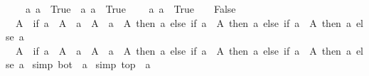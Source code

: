 \begin{isabellebody}
\ \ \ {\isacharbar}{\kern0pt}\ {\isacharparenleft}{\kern0pt}a\ a\ {\isasymRightarrow}\ True\ {\isacharbar}{\kern0pt}\ {\isacharparenleft}{\kern0pt}a\ a\ {\isasymRightarrow}\ True\isanewline
\ \ \ {\isacharbar}{\kern0pt}\ {\isacharparenleft}{\kern0pt}a\ a\ {\isasymRightarrow}\ True\ {\isacharbar}{\kern0pt}\ {\isacharunderscore}{\kern0pt}\ {\isasymRightarrow}\ False{\isacharparenright}{\kern0pt}{\isachardoublequoteclose}\isanewline
\isanewline
{}\isamarkupfalse%
\isanewline
\ \ {\isachardoublequoteopen}{\isasymSqinter}A\ {\isacharequal}{\kern0pt}\ {\isacharparenleft}{\kern0pt}if\ a\ {\isasymin}\ A\ {\isasymor}\ a\ {\isasymin}\ A\ {\isasymand}\ a\ {\isasymin}\ A\ then\ a\ else\ if\ a\ {\isasymin}\ A\ then\ a\ else\ if\ a\ {\isasymin}\ A\ then\ a\ else\ a\isanewline
{}\isamarkupfalse%
\isanewline
\ \ {\isachardoublequoteopen}{\isasymSqunion}A\ {\isacharequal}{\kern0pt}\ {\isacharparenleft}{\kern0pt}if\ a\ {\isasymin}\ A\ {\isasymor}\ a\ {\isasymin}\ A\ {\isasymand}\ a\ {\isasymin}\ A\ then\ a\ else\ if\ a\ {\isasymin}\ A\ then\ a\ else\ if\ a\ {\isasymin}\ A\ then\ a\ else\ a\isanewline
{}\isamarkupfalse%
\ {\isacharbrackleft}{\kern0pt}simp{\isacharbrackright}{\kern0pt}{\isacharcolon}{\kern0pt}\ {\isachardoublequoteopen}bot\ {\isacharequal}{\kern0pt}\ a\isanewline
{}\isamarkupfalse%
\ {\isacharbrackleft}{\kern0pt}simp{\isacharbrackright}{\kern0pt}{\isacharcolon}{\kern0pt}\ {\isachardoublequoteopen}top\ {\isacharequal}{\kern0pt}\ a\isanewline
{}\isamarkupfalse%
\isanewline

\end{isabellebody}

